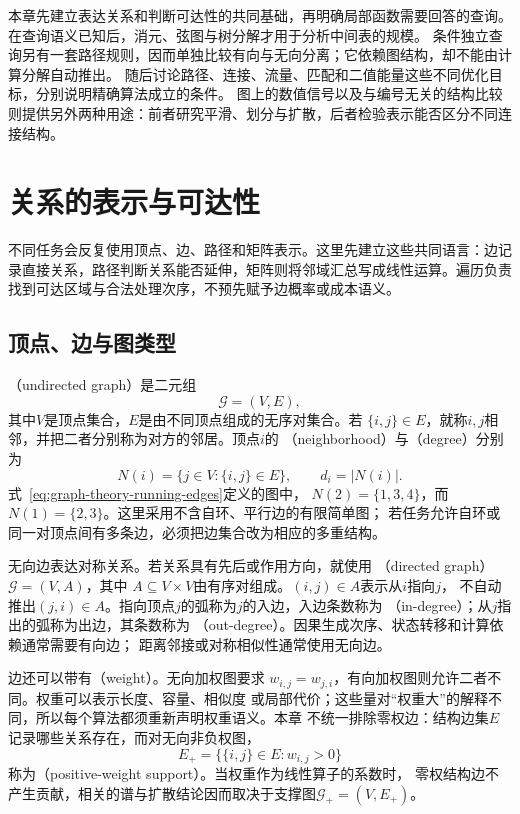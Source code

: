 本章先建立表达关系和判断可达性的共同基础，再明确局部函数需要回答的查询。
在查询语义已知后，消元、弦图与树分解才用于分析中间表的规模。
条件独立查询另有一套路径规则，因而单独比较有向与无向分离；它依赖图结构，却不能由计算分解自动推出。
随后讨论路径、连接、流量、匹配和二值能量这些不同优化目标，分别说明精确算法成立的条件。
图上的数值信号以及与编号无关的结构比较则提供另外两种用途：前者研究平滑、划分与扩散，后者检验表示能否区分不同连接结构。

\section{关系的表示与可达性}
\label{sec:graph-theory-objects-representations}

不同任务会反复使用顶点、边、路径和矩阵表示。这里先建立这些共同语言：边记录直接关系，路径判断关系能否延伸，矩阵则将邻域汇总写成线性运算。遍历负责找到可达区域与合法处理次序，不预先赋予边概率或成本语义。

\subsection{顶点、边与图类型}

（undirected graph）是二元组
\[
  \mathcal{G}=(V,E),
\]
其中\(V\)是顶点集合，\(E\)是由不同顶点组成的无序对集合。若
\(\{i,j\}\in E\)，就称\(i,j\)相邻，并把二者分别称为对方的邻居。顶点\(i\)的
（neighborhood）与（degree）分别为
\[
  N(i)=\{j\in V:\{i,j\}\in E\},\qquad d_i=|N(i)|.
\]
式~\eqref{eq:graph-theory-running-edges}定义的图中，
\(N(2)=\{1,3,4\}\)，而\(N(1)=\{2,3\}\)。这里采用不含自环、平行边的有限简单图；
若任务允许自环或同一对顶点间有多条边，必须把边集合改为相应的多重结构。

无向边表达对称关系。若关系具有先后或作用方向，就使用
（directed graph）\(\mathcal{G}=(V,A)\)，其中
\(A\subseteq V\times V\)由有序对组成。\((i,j)\in A\)表示从\(i\)指向\(j\)，
不自动推出\((j,i)\in A\)。指向顶点\(j\)的弧称为\(j\)的入边，入边条数称为
（in-degree）；从\(j\)指出的弧称为出边，其条数称为
（out-degree）。因果生成次序、状态转移和计算依赖通常需要有向边；
距离邻接或对称相似性通常使用无向边。

边还可以带有（weight）。无向加权图要求
\(w_{i,j}=w_{j,i}\)，有向加权图则允许二者不同。权重可以表示长度、容量、相似度
或局部代价；这些量对“权重大”的解释不同，所以每个算法都须重新声明权重语义。本章
不统一排除零权边：结构边集\(E\)记录哪些关系存在，而对无向非负权图，
\[
  E_+=\bigl\{\{i,j\}\in E:w_{i,j}>0\bigr\}
\]
称为（positive-weight support）。当权重作为线性算子的系数时，
零权结构边不产生贡献，相关的谱与扩散结论因而取决于支撑图\(\mathcal{G}_+=(V,E_+)\)。

